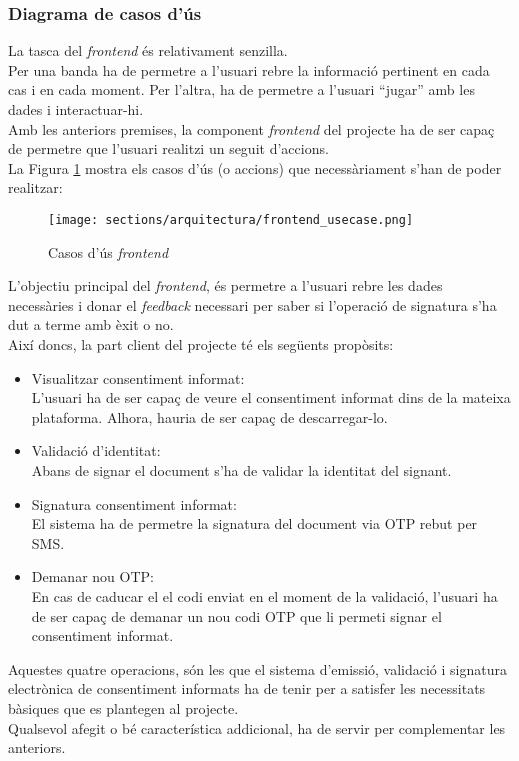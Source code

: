 \subsubsection{Diagrama de casos d'ús}
La tasca del \textit{frontend} és relativament senzilla.\\
Per una banda ha de permetre a l'usuari rebre la informació pertinent en cada cas i en cada moment. Per l'altra, ha de permetre a l'usuari ``jugar'' amb les dades i interactuar-hi.\\
Amb les anteriors premises, la component \textit{frontend} del projecte ha de ser capaç de permetre que l'usuari realitzi un seguit d'accions.\\
\newline La Figura \ref{fig:cas_us_frontend} mostra els casos d'ús (o accions) que necessàriament s'han de poder realitzar:
\begin{figure}[h]
\texttt{[image: sections/arquitectura/frontend\_usecase.png]}
\centering
\caption{Casos d'ús \textit{frontend}}
\label{fig:cas_us_frontend}
\end{figure}
\newline L'objectiu principal del \textit{frontend}, és permetre a l'usuari rebre les dades necessàries i donar el \textit{feedback} necessari per saber si l'operació de signatura s'ha dut a terme amb èxit o no.\\
\newline Així doncs, la part client del projecte té els següents propòsits:
\begin{itemize}
    \item Visualitzar consentiment informat:\\
    L'usuari ha de ser capaç de veure el consentiment informat dins de la mateixa plataforma. Alhora, hauria de ser capaç de descarregar-lo.
    \item Validació d'identitat:\\
    Abans de signar el document s'ha de validar la identitat del signant.
    \item Signatura consentiment informat:\\
    El sistema ha de permetre la signatura del document via OTP rebut per SMS.
    \item Demanar nou OTP:\\
    En cas de caducar el el codi enviat en el moment de la validació, l'usuari ha de ser capaç de demanar un nou codi OTP que li permeti signar el consentiment informat.
\end{itemize}
Aquestes quatre operacions, són les que el sistema d'emissió, validació i signatura electrònica de consentiment informats ha de tenir per a satisfer les necessitats bàsiques que es plantegen al projecte.\\
\newline Qualsevol afegit o bé característica addicional, ha de servir per complementar les anteriors.

